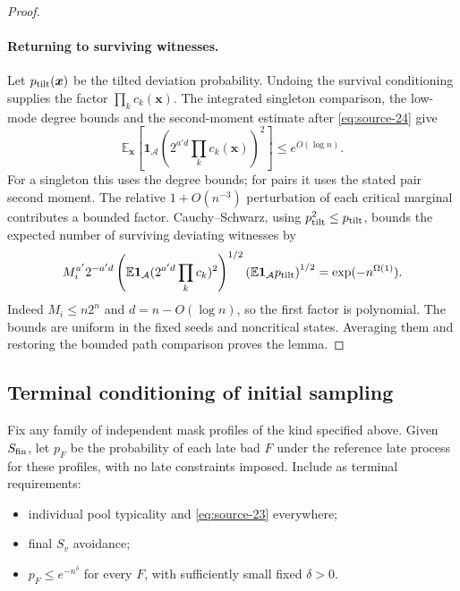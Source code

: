 \begin{proof}
\paragraph{Returning to surviving witnesses.}
Let \(p_{\rm tilt}(\boldsymbol x)\) be the tilted deviation
probability. Undoing the survival conditioning supplies the factor
\(\prod_k c_k(\boldsymbol x)\). The integrated singleton comparison,
the low-mode degree bounds and the second-moment estimate after
\eqref{eq:source-24} give
\[
 \mathbb E_{\boldsymbol x}\!\left[
 \mathbf1_{\mathcal A}(2^{a'd}\prod_k c_k(\boldsymbol x))^2\right]
 \le e^{O(\log n)}.
\]
For a singleton this uses the degree bounds; for pairs it uses the
stated pair second moment. The relative \(1+O(n^{-3})\) perturbation
of each critical marginal contributes a bounded factor.
Cauchy--Schwarz, using \(p_{\rm tilt}^2\le p_{\rm tilt}\), bounds
the expected number of surviving deviating witnesses by
\[
 M_i^{a'}2^{-a'd}
 \left(\mathbb E\mathbf1_{\mathcal A}
            (2^{a'd}\prod_k c_k)^2\right)^{1/2}
 \left(\mathbb E\mathbf1_{\mathcal A}p_{\rm tilt}\right)^{1/2}
 =\exp(-n^{\Omega(1)}).
\]
Indeed \(M_i\le n2^n\) and \(d=n-O(\log n)\), so the first factor
is polynomial. The bounds are uniform in the fixed seeds and
noncritical states. Averaging them and restoring the bounded path
comparison proves the lemma.
\end{proof}

\subsection{Terminal conditioning of initial sampling}
\label{sec:terminal-conditioning-of-initial-sampling}

Fix any family of independent mask profiles of the kind specified above.
Given \(S_{\rm fin}\), let \(p_F\) be the probability of each late bad \(F\)
under the reference late process for these profiles, with no late constraints
imposed. Include as terminal requirements:
\begin{itemize}
\item individual pool typicality and \eqref{eq:source-23} everywhere;
\item final \(S_v\) avoidance;
\item \(p_F\le e^{-n^\delta}\) for every \(F\), with sufficiently small fixed \(\delta>0\).
\end{itemize}

